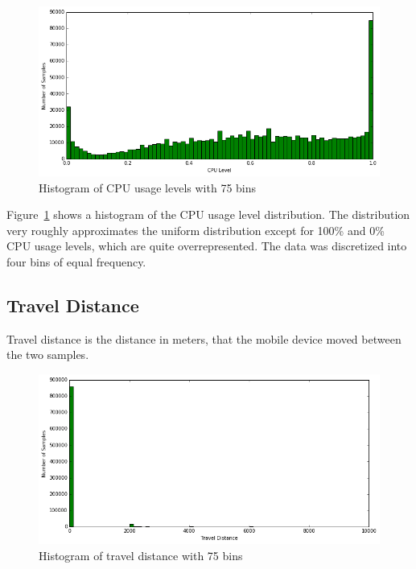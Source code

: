 \begin{figure}[!htbp]
	\centering
	\includegraphics[width=\textwidth]{images/carat-data/cpu_level.png}
	\caption{Histogram of CPU usage levels with 75 bins}
	\label{figure:carat-data-cpu-level}
\end{figure}  

Figure~\ref{figure:carat-data-cpu-level} shows a histogram of the CPU usage level distribution. The distribution very roughly approximates the uniform distribution except for 100\% and 0\% CPU usage levels, which are quite overrepresented. The data was discretized into four bins of equal frequency.

\subsection{Travel Distance}  

Travel distance is the distance in meters, that the mobile device moved between the two samples. 

\begin{figure}[!htbp]
	\centering
	\includegraphics[width=\textwidth]{images/carat-data/travel_distance.png}
	\caption{Histogram of travel distance with 75 bins}
	\label{figure:carat-data-travel-distance}
\end{figure}  

